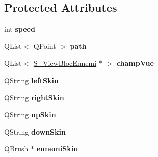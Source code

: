 \subsection*{Protected Attributes}
\begin{DoxyCompactItemize}
\item 
\hypertarget{class_ennemi_abf051ea1d034df4a8b0480e9387f2008}{}int {\bfseries speed}\label{class_ennemi_abf051ea1d034df4a8b0480e9387f2008}

\item 
\hypertarget{class_ennemi_acbd9a5c07e51a477a42daf0496d864e4}{}Q\+List$<$ Q\+Point $>$ {\bfseries path}\label{class_ennemi_acbd9a5c07e51a477a42daf0496d864e4}

\item 
\hypertarget{class_ennemi_a54e9c4370bff0dd2a6b05c24a4fd06f7}{}Q\+List$<$ \hyperlink{class_s___view_bloc_ennemi}{S\+\_\+\+View\+Bloc\+Ennemi} $\ast$ $>$ {\bfseries champ\+Vue}\label{class_ennemi_a54e9c4370bff0dd2a6b05c24a4fd06f7}

\item 
\hypertarget{class_ennemi_a5537ad37a49d572d09a76749238490c2}{}Q\+String {\bfseries left\+Skin}\label{class_ennemi_a5537ad37a49d572d09a76749238490c2}

\item 
\hypertarget{class_ennemi_ab63f4a7fbff796d8c368bd49e254561a}{}Q\+String {\bfseries right\+Skin}\label{class_ennemi_ab63f4a7fbff796d8c368bd49e254561a}

\item 
\hypertarget{class_ennemi_abe2b3007be5ed71b5547a66407b8db3e}{}Q\+String {\bfseries up\+Skin}\label{class_ennemi_abe2b3007be5ed71b5547a66407b8db3e}

\item 
\hypertarget{class_ennemi_a3a72c0537216823ea706923d20f9ed5a}{}Q\+String {\bfseries down\+Skin}\label{class_ennemi_a3a72c0537216823ea706923d20f9ed5a}

\item 
\hypertarget{class_ennemi_aef6146a86a5b04b34f0e7292a1ddd237}{}Q\+Brush $\ast$ {\bfseries ennemi\+Skin}\label{class_ennemi_aef6146a86a5b04b34f0e7292a1ddd237}

\end{DoxyCompactItemize}
